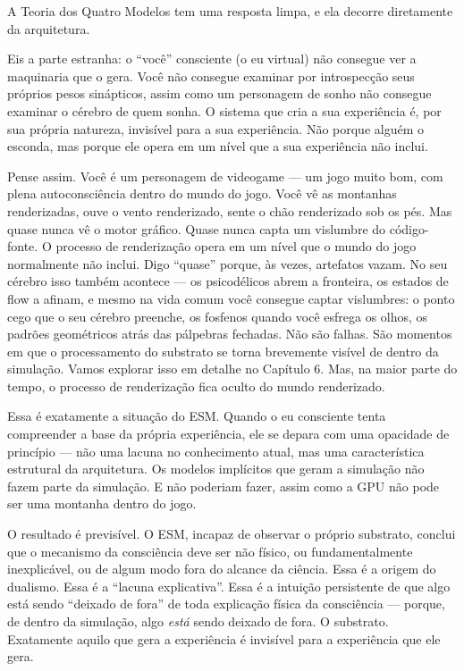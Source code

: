 \documentclass[11pt, twoside, openright]{book}
\begin{document}
A Teoria dos Quatro Modelos tem uma resposta limpa, e ela decorre diretamente da arquitetura.

Eis a parte estranha: o ``você'' consciente (o eu virtual) não consegue ver a maquinaria que o gera. Você não consegue examinar por introspecção seus próprios pesos sinápticos, assim como um personagem de sonho não consegue examinar o cérebro de quem sonha. O sistema que cria a sua experiência é, por sua própria natureza, invisível para a sua experiência. Não porque alguém o esconda, mas porque ele opera em um nível que a sua experiência não inclui.

Pense assim. Você é um personagem de videogame --- um jogo muito bom, com plena autoconsciência dentro do mundo do jogo. Você vê as montanhas renderizadas, ouve o vento renderizado, sente o chão renderizado sob os pés. Mas quase nunca vê o motor gráfico. Quase nunca capta um vislumbre do código-fonte. O processo de renderização opera em um nível que o mundo do jogo normalmente não inclui. Digo ``quase'' porque, às vezes, artefatos vazam. No seu cérebro isso também acontece --- os psicodélicos abrem a fronteira, os estados de flow a afinam, e mesmo na vida comum você consegue captar vislumbres: o ponto cego que o seu cérebro preenche, os fosfenos quando você esfrega os olhos, os padrões geométricos atrás das pálpebras fechadas. Não são falhas. São momentos em que o processamento do substrato se torna brevemente visível de dentro da simulação. Vamos explorar isso em detalhe no Capítulo 6. Mas, na maior parte do tempo, o processo de renderização fica oculto do mundo renderizado.

Essa é exatamente a situação do ESM. Quando o eu consciente tenta compreender a base da própria experiência, ele se depara com uma opacidade de princípio --- não uma lacuna no conhecimento atual, mas uma característica estrutural da arquitetura. Os modelos implícitos que geram a simulação não fazem parte da simulação. E não poderiam fazer, assim como a GPU não pode ser uma montanha dentro do jogo.

O resultado é previsível. O ESM, incapaz de observar o próprio substrato, conclui que o mecanismo da consciência deve ser não físico, ou fundamentalmente inexplicável, ou de algum modo fora do alcance da ciência. Essa é a origem do dualismo. Essa é a ``lacuna explicativa''. Essa é a intuição persistente de que algo está sendo ``deixado de fora'' de toda explicação física da consciência --- porque, de dentro da simulação, algo \textit{está} sendo deixado de fora. O substrato. Exatamente aquilo que gera a experiência é invisível para a experiência que ele gera.
\end{document}
